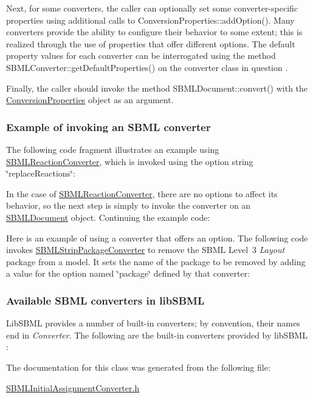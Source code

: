 Next, for some converters, the caller can optionally set some converter-\/specific properties using additional calls to Conversion\+Properties\+::add\+Option(). Many converters provide the ability to configure their behavior to some extent; this is realized through the use of properties that offer different options. The default property values for each converter can be interrogated using the method S\+B\+M\+L\+Converter\+::get\+Default\+Properties() on the converter class in question .

Finally, the caller should invoke the method S\+B\+M\+L\+Document\+::convert() with the \hyperlink{class_conversion_properties}{Conversion\+Properties} object as an argument.\hypertarget{classdoc__section__using__sbml__converters_converter-example}{}\subsubsection{Example of invoking an S\+B\+M\+L converter}\label{classdoc__section__using__sbml__converters_converter-example}
The following code fragment illustrates an example using \hyperlink{class_s_b_m_l_reaction_converter}{S\+B\+M\+L\+Reaction\+Converter}, which is invoked using the option string {\ttfamily \char`\"{}replace\+Reactions\char`\"{}}\+:

In the case of \hyperlink{class_s_b_m_l_reaction_converter}{S\+B\+M\+L\+Reaction\+Converter}, there are no options to affect its behavior, so the next step is simply to invoke the converter on an \hyperlink{class_s_b_m_l_document}{S\+B\+M\+L\+Document} object. Continuing the example code\+:

Here is an example of using a converter that offers an option. The following code invokes \hyperlink{class_s_b_m_l_strip_package_converter}{S\+B\+M\+L\+Strip\+Package\+Converter} to remove the S\+B\+ML Level~3 {\itshape Layout} package from a model. It sets the name of the package to be removed by adding a value for the option named {\ttfamily \char`\"{}package\char`\"{}} defined by that converter\+:\hypertarget{classdoc__section__using__sbml__converters_available-converters}{}\subsubsection{Available S\+B\+M\+L converters in lib\+S\+B\+ML}\label{classdoc__section__using__sbml__converters_available-converters}
Lib\+S\+B\+ML provides a number of built-\/in converters; by convention, their names end in {\itshape Converter}. The following are the built-\/in converters provided by lib\+S\+B\+ML \+:

The documentation for this class was generated from the following file\+:\begin{DoxyCompactItemize}
\item 
\hyperlink{_s_b_m_l_initial_assignment_converter_8h}{S\+B\+M\+L\+Initial\+Assignment\+Converter.\+h}\end{DoxyCompactItemize}
